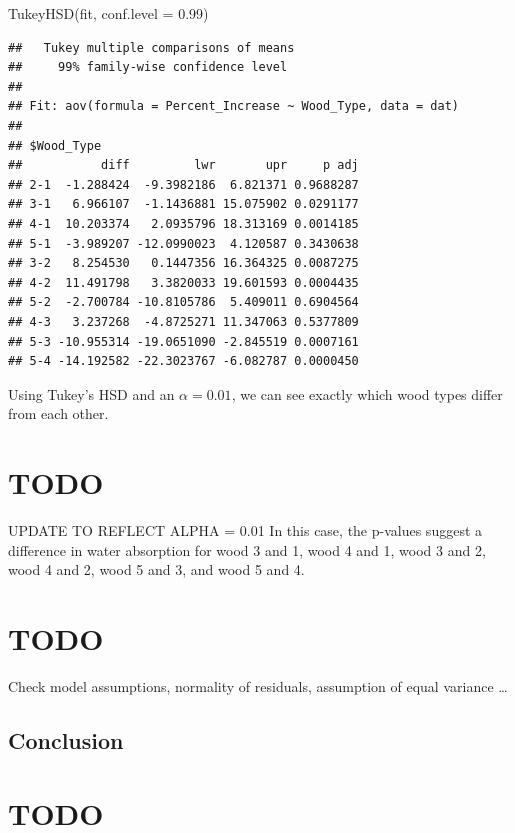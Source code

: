 \documentclass[
]{article}
\newenvironment{Shaded}{\begin{snugshade}}{\end{snugshade}}
\newcommand{\AttributeTok}[1]{\textcolor[rgb]{0.77,0.63,0.00}{#1}}
\newcommand{\FloatTok}[1]{\textcolor[rgb]{0.00,0.00,0.81}{#1}}
\newcommand{\FunctionTok}[1]{\textcolor[rgb]{0.00,0.00,0.00}{#1}}
\newcommand{\NormalTok}[1]{#1}
\begin{document}
\begin{Shaded}
\begin{Highlighting}[]
\FunctionTok{TukeyHSD}\NormalTok{(fit, }\AttributeTok{conf.level =} \FloatTok{0.99}\NormalTok{)}
\end{Highlighting}
\end{Shaded}

\begin{verbatim}
##   Tukey multiple comparisons of means
##     99% family-wise confidence level
## 
## Fit: aov(formula = Percent_Increase ~ Wood_Type, data = dat)
## 
## $Wood_Type
##           diff         lwr       upr     p adj
## 2-1  -1.288424  -9.3982186  6.821371 0.9688287
## 3-1   6.966107  -1.1436881 15.075902 0.0291177
## 4-1  10.203374   2.0935796 18.313169 0.0014185
## 5-1  -3.989207 -12.0990023  4.120587 0.3430638
## 3-2   8.254530   0.1447356 16.364325 0.0087275
## 4-2  11.491798   3.3820033 19.601593 0.0004435
## 5-2  -2.700784 -10.8105786  5.409011 0.6904564
## 4-3   3.237268  -4.8725271 11.347063 0.5377809
## 5-3 -10.955314 -19.0651090 -2.845519 0.0007161
## 5-4 -14.192582 -22.3023767 -6.082787 0.0000450
\end{verbatim}

Using Tukey's HSD and an \(\alpha = 0.01\), we can see exactly which
wood types differ from each other.

\hypertarget{todo}{%
\section{TODO}\label{todo}}

UPDATE TO REFLECT ALPHA = 0.01 In this case, the p-values suggest a
difference in water absorption for wood 3 and 1, wood 4 and 1, wood 3
and 2, wood 4 and 2, wood 5 and 3, and wood 5 and 4.

\hypertarget{todo-1}{%
\section{TODO}\label{todo-1}}

Check model assumptions, normality of residuals, assumption of equal
variance \ldots{}

\hypertarget{conclusion}{%
\subsection{Conclusion}\label{conclusion}}

\hypertarget{todo-2}{%
\section{TODO}\label{todo-2}}
\end{document}

